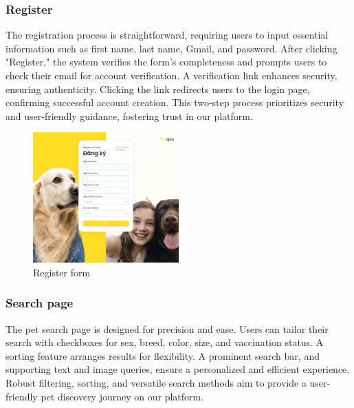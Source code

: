 \subsubsection{Register}

The registration process is straightforward, requiring users to input essential information such as first name, last name, Gmail, and password. After clicking "Register," the system verifies the form's completeness and prompts users to check their email for account verification. A verification link enhances security, ensuring authenticity. Clicking the link redirects users to the login page, confirming successful account creation. This two-step process prioritizes security and user-friendly guidance, fostering trust in our platform.

\begin{figure}[H]
    \centering
    \includegraphics[width=0.5\textwidth]{Figures/register_ui.png}
    \caption{Register form}
\end{figure}

\subsubsection{Search page}

The pet search page is designed for precision and ease. Users can tailor their search with checkboxes for sex, breed, color, size, and vaccination status. A sorting feature arranges results for flexibility. A prominent search bar, and supporting text and image queries, ensure a personalized and efficient experience. Robust filtering, sorting, and versatile search methods aim to provide a user-friendly pet discovery journey on our platform.

